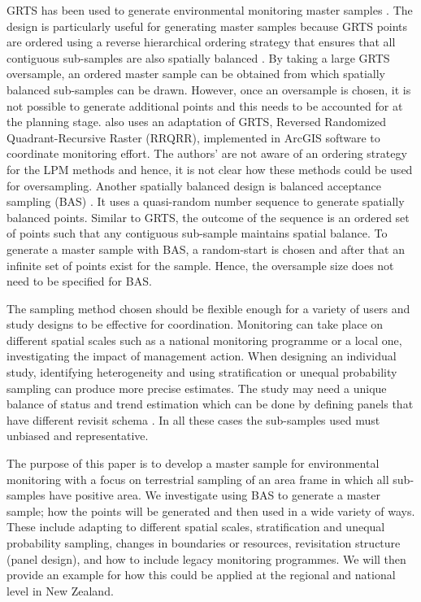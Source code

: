 \documentclass[titlepage]{article}
\begin{document}
GRTS has been used to generate environmental monitoring master samples \citep{LarsenOlsenStevens2008}. The design is particularly useful for generating master samples because GRTS points are ordered using a reverse hierarchical ordering strategy that ensures that all contiguous sub-samples are also spatially balanced \citep{StevensOlsen2004}. By taking a large GRTS oversample, an ordered master sample can be obtained from which spatially balanced sub-samples can be drawn. However, once an oversample is chosen, it is not possible to generate additional points and this needs to be accounted for at the planning stage. \citet{theobald2016} also uses an adaptation of GRTS, Reversed Randomized Quadrant-Recursive
Raster (RRQRR), implemented in ArcGIS software \citep{theobald2007} to coordinate monitoring effort. The authors' are not aware of an ordering strategy for the LPM methods and hence, it is not clear how these methods could be used for oversampling. Another spatially balanced design is balanced acceptance sampling (BAS) \citep{Robertson2013}. It uses a quasi-random number sequence to generate spatially balanced points. Similar to GRTS, the outcome of the sequence is an ordered set of points such that any contiguous sub-sample maintains spatial balance. To generate a master sample with BAS, a random-start is chosen and after that an infinite set of points exist for the sample. Hence, the oversample size does not need to be specified for BAS.

The sampling method chosen should be flexible enough for a variety of users and study designs to be effective for coordination. Monitoring can take place on different spatial scales such as a national monitoring programme or a local one, investigating the impact of management action. When designing an individual study, identifying heterogeneity and using stratification \citep{Yoccoz2001} or unequal probability sampling \citep{Stevens1997} can produce more precise estimates. The study may need a unique balance of status and trend estimation which can be done by defining panels that have different revisit schema \citep{Skalski1990, Mcdonald2003, StevensOlsen1999}. In all these cases the sub-samples used must unbiased and representative.

The purpose of this paper is to develop a master sample for environmental monitoring with a focus on terrestrial sampling of an area frame in which all sub-samples have positive area. We investigate using BAS to generate a master sample; how the points will be generated and then used in a wide variety of ways. These include adapting to different spatial scales, stratification and unequal probability sampling, changes in boundaries or resources, revisitation structure (panel design), and how to include legacy monitoring programmes. We will then provide an example for how this could be applied at the regional and national level in New Zealand.
\end{document}
